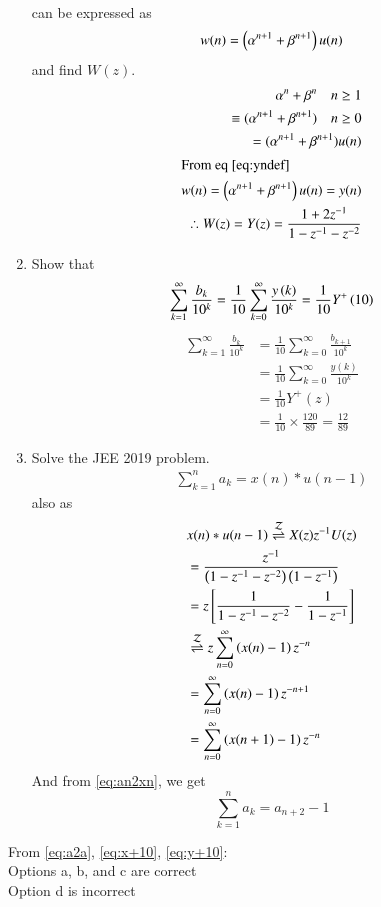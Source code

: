 \documentclass[journal,12pt,twocolumn]{IEEEtran}
\renewcommand\thesection{\arabic{section}}
\begin{document}
\begin{enumerate}[label=\thesection.\arabic*,ref=\thesection.\theenumi]
\begin{align}
	\label{eq:yn-exp}
\end{align}
can be expressed as 
\begin{align}
	w(n) =\left(\alpha^{n+1} + \beta^{n+1}\right)u(n)
\end{align}
and find $W(z)$.\\
\solution %
\begin{align}
	\alpha^n + \beta^n \quad n \ge 1\\
	\equiv (\alpha^{n+1} + \beta^{n+1})\quad n \ge 0\\
	= (\alpha^{n+1} + \beta^{n+1})u(n)\\
	\intertext{From eq \eqref{eq:yndef}}
	w(n) = \left(\alpha^{n+1} + \beta^{n+1}\right)u(n) = y(n)\\
	\therefore W(z) = Y(z) = \frac{1 + 2z^{-1}}{1 - z^{-1} - z^{-2}}
\end{align}

\item Show that 
\begin{align}
	\sum_{k=1}^{\infty}\frac{b_k}{10^k} =
	\frac{1}{10}\sum_{k=0}^{\infty}\frac{y\left(k\right)}{10^k} =\frac{1}{10}Y^{+}\left({10}\right)
\label{eq:y+10}
\end{align}
\solution
\begin{align}
	\sum_{k=1}^{\infty}\frac{b_k}{10^k} &= \frac{1}{10}\sum_{k = 0}^{\infty}\frac{b_{k+1}}{10^k} \\
	&= \frac{1}{10}\sum_{k = 0}^{\infty}\frac{y(k)}{10^k} \\
	&= \frac{1}{10}Y^+(z) \\
	&= \frac{1}{10}\times\frac{120}{89} = \frac{12}{89}
\end{align}
\break
\item Solve the JEE 2019 problem.\\
\label{pr:1-6}
\solution
\begin{align}
	\sum_{k = 1}^{n}a_k = x(n)*u(n - 1)
\end{align}
also as
\begin{align}
	&x(n)*u(n - 1) \overset{\mathcal{Z}}{ \rightleftharpoons} X(z)z^{-1}U(z) \\
	&= \frac{z^{-1}}{\left(1 - z^{-1} - z^{-2}\right)\left(1 - z^{-1}\right)} \\
	&= z{}\left[\frac{1}{1 - z^{-1} - z^{-2}} - \frac{1}{1 - z^{-1}}\right] \\
	&\overset{\mathcal{Z}}{ \rightleftharpoons} z\sum_{n = 0}^{\infty}\left(x(n) - 1\right)z^{-n} \\
	&= \sum_{n = 0}^{\infty}\left(x(n) - 1\right)z^{-n + 1} \\
	&= \sum_{n = 0}^{\infty}\left(x(n + 1) - 1\right)z^{-n} 
\end{align}
And from \eqref{eq:an2xn}, we get
\begin{equation}
	\sum_{k = 1}^{n}a_k = a_{n+2} - 1
	\label{eq:a2a}
\end{equation}
\end{enumerate}
\onehalfspacing
From \eqref{eq:a2a}, \eqref{eq:x+10}, \eqref{eq:y+10}:\\
Options  a, b, and c are correct\\
Option  d is incorrect
\end{document}
